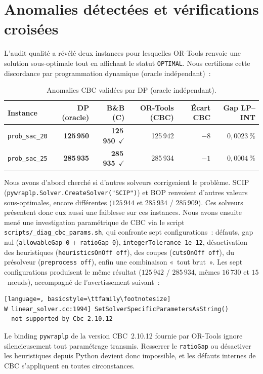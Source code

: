 \documentclass[11pt,a4paper]{article}
\begin{document}
\section{Anomalies détectées et vérifications croisées}
\label{sec:anomalies}

L'audit qualité a révélé deux instances pour lesquelles OR-Tools renvoie une solution sous-optimale tout en affichant le statut \texttt{OPTIMAL}. Nous certifions cette discordance par programmation dynamique (oracle indépendant)~:

\begin{table}[!htbp]
\centering
\small
\setlength{\tabcolsep}{8pt}
\begin{tabular}{lrrrrr}
\toprule
\textbf{Instance} & \textbf{DP (oracle)} & \textbf{B\&B (C)} & \textbf{OR-Tools (CBC)} & \textbf{Écart CBC} & \textbf{Gap LP--INT} \\
\midrule
\texttt{prob\_sac\_20} & \textbf{125\,950} & \textbf{125\,950}~$\checkmark$ & 125\,942 & $-8$ & $0{,}0023~\%$ \\
\texttt{prob\_sac\_25} & \textbf{285\,935} & \textbf{285\,935}~$\checkmark$ & 285\,934 & $-1$ & $0{,}0004~\%$ \\
\bottomrule
\end{tabular}
\caption{Anomalies CBC validées par DP (oracle indépendant).}
\label{tab:anomalies}
\end{table}

Nous avons d'abord cherché si d'autres solveurs corrigeaient le problème. SCIP~\cite{scip} (\texttt{pywraplp.Solver.CreateSolver("SCIP")}) et BOP renvoient d'autres valeurs sous-optimales, encore différentes ($125\,944$ et $285\,934$ / $285\,909$). Ces solveurs présentent donc eux aussi une faiblesse sur ces instances. Nous avons ensuite mené une investigation paramétrique de CBC via le script \texttt{scripts/\_diag\_cbc\_params.sh}, qui confronte sept configurations~: défauts, gap nul (\texttt{allowableGap 0} + \texttt{ratioGap 0}), \texttt{integerTolerance 1e-12}, désactivation des heuristiques (\texttt{heuristicsOnOff off}), des coupes (\texttt{cutsOnOff off}), du présolveur (\texttt{preprocess off}), enfin une combinaison «~tout brut~». Les sept configurations produisent le même résultat ($125\,942$ / $285\,934$, mêmes $16\,730$ et $15$~nœuds), accompagné de l'avertissement suivant~:
\begin{lstlisting}[language=, basicstyle=\ttfamily\footnotesize]
W linear_solver.cc:1994] SetSolverSpecificParametersAsString()
  not supported by Cbc 2.10.12
\end{lstlisting}
Le binding \texttt{pywraplp} de la version CBC~2.10.12 fournie par OR-Tools ignore silencieusement tout paramétrage transmis. Resserrer le \texttt{ratioGap} ou désactiver les heuristiques depuis Python devient donc impossible, et les défauts internes de CBC s'appliquent en toutes circonstances.
\end{document}
